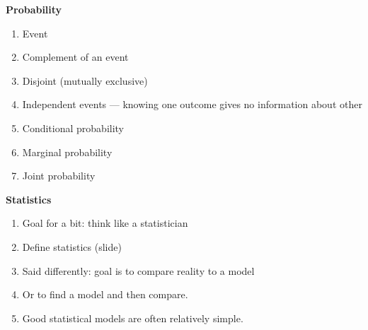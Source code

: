 \textbf{Probability}
\begin{enumerate}
\item Event
\item Complement of an event
\item Disjoint (mutually exclusive)
\item Independent events --- knowing one outcome gives no information about other
\item Conditional probability
\item Marginal probability
\item Joint probability
\end{enumerate}

\textbf{Statistics}
\begin{enumerate}
\item Goal for a bit: think like a statistician
\item Define statistics (slide)
\item Said differently: goal is to compare reality to a model
\item Or to find a model and then compare.
\item Good statistical models are often relatively simple.
\end{enumerate}

